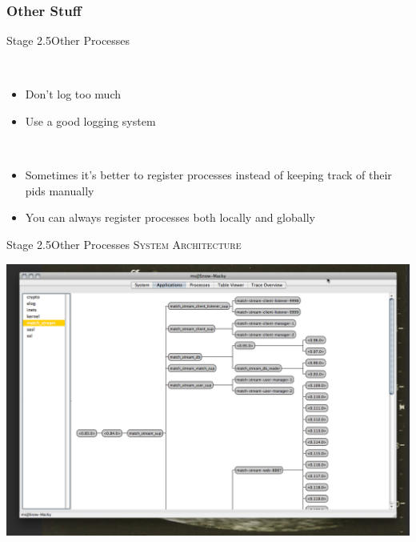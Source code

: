 \documentclass[utf8]{beamer}
\begin{document}
\subsubsection{Other Stuff}
\begin{frame}{Stage 2.5}{Other Processes}
	\begin{description}
		\item<+->[Logging]\ \\
			\begin{itemize}
				\item Don't log too much
				\item Use a good logging system
			\end{itemize}
		\item<+->[Registration]\ \\
			\begin{itemize}
				\item Sometimes it's better to register processes instead of keeping track of their pids manually
				\item You can always register processes \alert{both} locally and globally
			\end{itemize}
	\end{description}
\end{frame}
\begin{frame}{Stage 2.5}{Other Processes}
	\textsc{System Architecture}
	\begin{center}
		\includegraphics[height=.75\textheight]{img/running-late.png}
	\end{center}
\end{frame}
\end{document}
